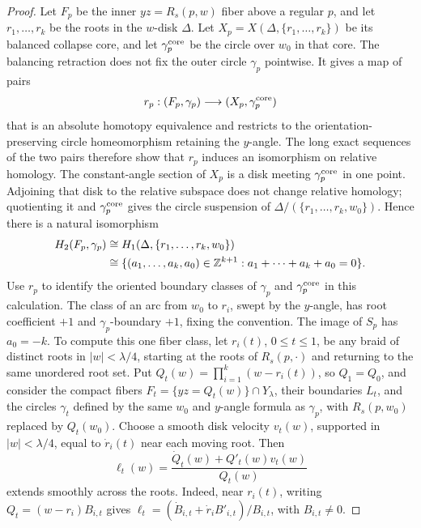 \begin{proof}
Let \(F_p\) be the inner \(yz=R_s(p,w)\) fiber above a
regular \(p\), and let \(r_1,\dots,r_k\) be the roots in
the \(w\)-disk \(\Delta\). Let
\(X_p=X(\Delta,\{r_1,\dots,r_k\})\) be its balanced collapse core,
and let \(\gamma_p^{\rm core}\) be the circle over \(w_0\) in that
core. The balancing retraction does not fix the outer circle
\(\gamma_p\) pointwise. It gives a map of pairs
\[
 r_p:(F_p,\gamma_p)\longrightarrow(X_p,\gamma_p^{\rm core})
\]
that is an absolute homotopy equivalence and restricts to the
orientation-preserving circle homeomorphism retaining the \(y\)-angle.
The long exact sequences of the two pairs therefore show that
\(r_p\) induces an isomorphism on relative homology.
The constant-angle section of \(X_p\) is a disk meeting
\(\gamma_p^{\rm core}\) in one point. Adjoining that disk to the
relative subspace does not change relative homology; quotienting
it and \(\gamma_p^{\rm core}\) gives the circle suspension of
\(\Delta/(\{r_1,\dots,r_k,w_0\})\). Hence there is a natural isomorphism
\begin{equation}
\begin{split}
 H_2(F_p,\gamma_p)
 &\cong H_1(\Delta,\{r_1,\dots,r_k,w_0\})\\
 &\cong\{(a_1,\dots,a_k,a_0)\in\mathbb Z^{k+1}:
             a_1+\cdots+a_k+a_0=0\}.
\end{split}
\label{eq:tube-15}
\end{equation}
Use \(r_p\) to identify the oriented boundary classes of
\(\gamma_p\) and \(\gamma_p^{\rm core}\) in this calculation.
The class of an arc from \(w_0\) to \(r_i\), swept by
the \(y\)-angle, has root coefficient \(+1\) and
\(\gamma_p\)-boundary \(+1\), fixing the convention.
The image of \(S_p\) has \(a_0=-k\).
To compute this one fiber class, let \(r_i(t)\), \(0\le t\le1\),
be any braid of distinct roots in \(|w|<\lambda/4\), starting at
the roots of \(R_s(p,\cdot)\) and returning to the same unordered
root set. Put
\(Q_t(w)=\prod_{i=1}^k(w-r_i(t))\), so \(Q_1=Q_0\), and consider
the compact fibers \(F_t=\{yz=Q_t(w)\}\cap Y_\lambda\), their
boundaries \(L_t\), and the circles \(\gamma_t\) defined by the
same \(w_0\) and \(y\)-angle formula as \(\gamma_p\), with
\(R_s(p,w_0)\) replaced by \(Q_t(w_0)\).
Choose a smooth disk velocity \(v_t(w)\), supported in
\(|w|<\lambda/4\), equal to \(\dot r_i(t)\) near each moving root.
Then
\[
 \ell_t(w)=\frac{\dot Q_t(w)+Q'_t(w)v_t(w)}{Q_t(w)}
\]
extends smoothly across the roots. Indeed, near \(r_i(t)\), writing
\(Q_t=(w-r_i)B_{i,t}\) gives
\(\ell_t=(\dot B_{i,t}+\dot r_i B'_{i,t})/B_{i,t}\), with
\(B_{i,t}\ne0\).


\end{proof}
